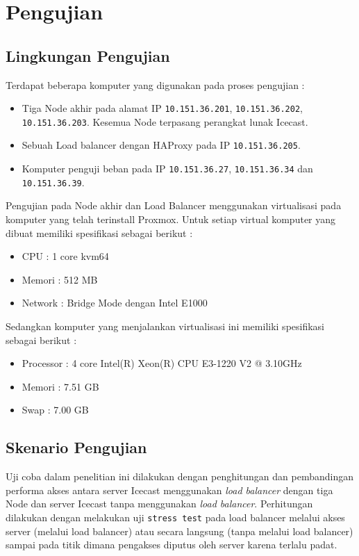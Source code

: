\chapter{Pengujian}

\section{Lingkungan Pengujian}
Terdapat beberapa komputer yang digunakan pada proses pengujian :
\begin{itemize}
\item Tiga Node akhir pada alamat IP \texttt{10.151.36.201}, \texttt{10.151.36.202}, \texttt{10.151.36.203}. Kesemua Node terpasang perangkat lunak Icecast.
\item Sebuah Load balancer dengan HAProxy pada IP \texttt{10.151.36.205}.
\item Komputer penguji beban pada IP \texttt{10.151.36.27}, \texttt{10.151.36.34} dan \texttt{10.151.36.39}.
\end{itemize}

Pengujian pada Node akhir dan Load Balancer menggunakan virtualisasi pada komputer yang telah terinstall Proxmox. Untuk setiap virtual komputer yang dibuat memiliki spesifikasi sebagai berikut :

\begin{itemize}
    \item CPU \tabto{2cm} : 1 core kvm64
    \item Memori \tabto{2cm} : 512 MB
    \item Network \tabto{2cm} : Bridge Mode dengan Intel E1000
\end{itemize}

Sedangkan komputer yang menjalankan virtualisasi ini memiliki spesifikasi sebagai berikut :

\begin{itemize}
    \item Processor \tabto{2cm} : 4 core Intel(R) Xeon(R) CPU E3-1220 V2 @ 3.10GHz
    \item Memori \tabto{2cm} : 7.51 GB
    \item Swap \tabto{2cm} : 7.00 GB
\end{itemize}


\section{Skenario Pengujian}
Uji coba dalam penelitian ini dilakukan dengan penghitungan dan pembandingan performa akses antara server Icecast menggunakan \textit{load balancer} dengan tiga Node dan server Icecast tanpa menggunakan \textit{load balancer}. Perhitungan dilakukan dengan melakukan uji \texttt{stress test}  pada load balancer melalui akses server (melalui load balancer) atau secara langsung (tanpa melalui load balancer) sampai pada titik dimana pengakses diputus oleh server karena terlalu padat. 

